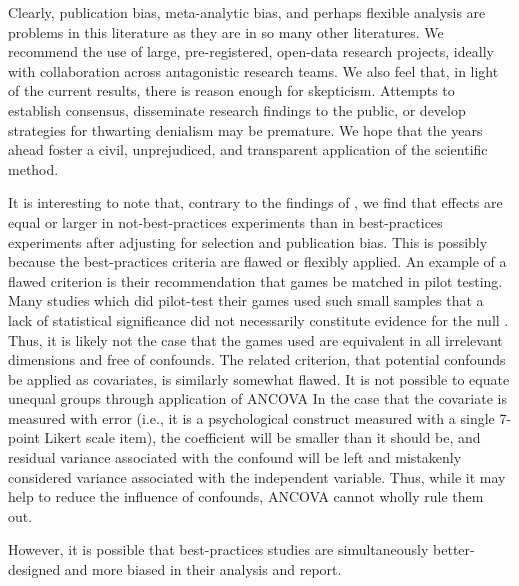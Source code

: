 \documentclass[man]{apa6}
\begin{document}
Clearly, publication bias, meta-analytic bias, and perhaps flexible analysis are problems in this literature as they are in so many other literatures. We recommend the use of large, pre-registered, open-data research projects, ideally with collaboration across antagonistic research teams. We also feel that, in light of the current results, there is reason enough for skepticism. Attempts to establish consensus, disseminate research findings to the public, or develop strategies for thwarting denialism may be premature. We hope that the years ahead foster a civil, unprejudiced, and transparent application of the scientific method. 

It is interesting to note that, contrary to the findings of \citet{Anderson:etal:2010}, we find that effects are equal or larger in not-best-practices experiments than in best-practices experiments after adjusting for selection and publication bias. This is possibly because the best-practices criteria are flawed or flexibly applied. An example of a flawed criterion is their recommendation that games be matched in pilot testing. Many studies which did pilot-test their games used such small samples that a lack of statistical significance did not necessarily constitute evidence for the null \citep{Hilgard:etal:2015}. Thus, it is likely not the case that the games used are equivalent in all irrelevant dimensions and free of confounds. The related criterion, that potential confounds be applied as covariates, is similarly somewhat flawed. It is not possible to equate unequal groups through application of ANCOVA \citep{Miller:Chapman:1999} %
In the case that the covariate is measured with error (i.e., it is a psychological construct measured with a single 7-point Likert scale item), the coefficient will be smaller than it should be, and residual variance associated with the confound will be left and mistakenly considered variance associated with the independent variable. Thus, while it may help to reduce the influence of confounds, ANCOVA cannot wholly rule them out.

However, it is possible that best-practices studies are simultaneously better-designed and more biased in their analysis and report. 
\end{document}
